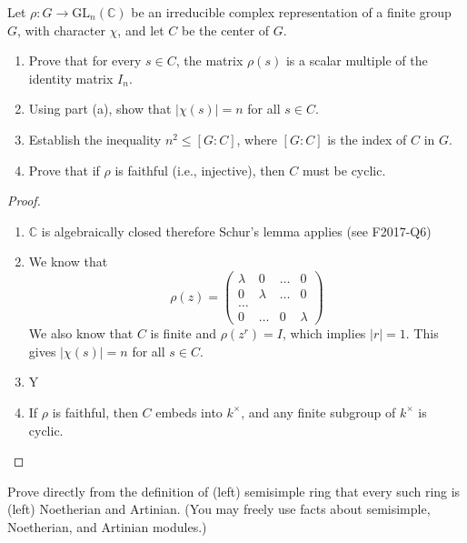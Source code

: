 \begin{prob}[F2009-Q6, F2001-Q5]
    Let \( \rho \colon G \to \mathrm{GL}_n(\mathbb{C}) \) be an irreducible complex representation of a finite group \( G \), with character \( \chi \), and let \( C \) be the center of \( G \).
    
    \begin{enumerate}
        \item Prove that for every \( s \in C \), the matrix \( \rho(s) \) is a scalar multiple of the identity matrix \( I_n \).
        
        \item Using part (a), show that \( |\chi(s)| = n \) for all \( s \in C \).
        
        \item Establish the inequality \( n^2 \leq [G : C] \), where \( [G : C] \) is the index of \( C \) in \( G \).
        
        \item Prove that if \( \rho \) is faithful (i.e., injective), then \( C \) must be cyclic.
    \end{enumerate}
\end{prob}
\begin{proof}
    \begin{enumerate}
        \item $\mathbb{C}$ is algebraically closed therefore Schur's lemma applies (see F2017-Q6)
        \item We know that 
        \begin{equation*}
            \rho(z)=\begin{pmatrix}
                \lambda&0&\dots&0\\
                0&\lambda&\dots&0\\
                \dots\\
                0&\dots&0&\lambda
            \end{pmatrix}
        \end{equation*}
        We also know that $C$ is finite and $\rho(z^r)=I$, which implies $|r|=1$. This gives $|\chi(s)|=n$ for all $s\in C$. 
        \item Y
        \item If $\rho$ is faithful, then $C$ embeds into $k^\times$, and any finite subgroup of $k^\times$ is cyclic.
    \end{enumerate}
\end{proof}

\begin{prob}[S2017-Q5]
    Prove directly from the definition of (left) semisimple ring that every such
ring is (left) Noetherian and Artinian. (You may freely use facts about
semisimple, Noetherian, and Artinian modules.)
\end{prob}

